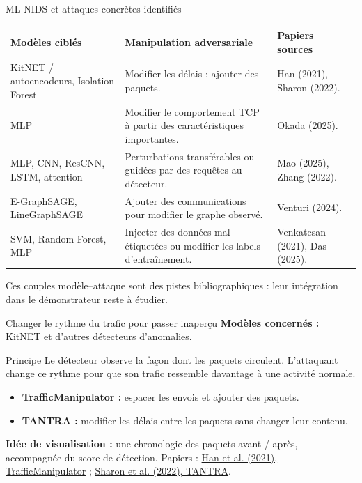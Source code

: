 \documentclass[aspectratio=169,11pt]{beamer}
\begin{document}
\begin{frame}{ML-NIDS et attaques concrètes identifiés}
  \small
  \renewcommand{\arraystretch}{1.35}
  \begin{tabularx}{\textwidth}{@{}p{}Xp{}@{}}
    \toprule
    \textbf{Modèles ciblés} & \textbf{Manipulation adversariale} & \textbf{Papiers sources} \\
    \midrule
    KitNET / autoencodeurs, Isolation Forest
      & Modifier les délais ; ajouter des paquets.
      & Han (2021), Sharon (2022). \\
    MLP
      & Modifier le comportement TCP à partir des caractéristiques importantes.
      & Okada (2025). \\
    MLP, CNN, ResCNN, LSTM, attention
      & Perturbations transférables ou guidées par des requêtes au détecteur.
      & Mao (2025), Zhang (2022). \\
    E-GraphSAGE, LineGraphSAGE
      & Ajouter des communications pour modifier le graphe observé.
      & Venturi (2024). \\
    SVM, Random Forest, MLP
      & Injecter des données mal étiquetées ou modifier les labels d'entraînement.
      & Venkatesan (2021), Das (2025). \\
    \bottomrule
  \end{tabularx}
  \vfill
  \small Ces couples modèle--attaque sont des pistes bibliographiques : leur intégration
  dans le démonstrateur reste à étudier.
\end{frame}

\begin{frame}{Changer le rythme du trafic pour passer inaperçu}
  \textbf{Modèles concernés :} KitNET et d'autres détecteurs d'anomalies.
  \vspace{1em}
  \begin{block}{Principe}
    Le détecteur observe la façon dont les paquets circulent.
    L'attaquant change ce rythme pour que son trafic ressemble davantage
    à une activité normale.
  \end{block}
  \begin{itemize}
    \setlength{\itemsep}{.8em}
    \item \textbf{TrafficManipulator :} espacer les envois et ajouter des paquets.
    \item \textbf{TANTRA :} modifier les délais entre les paquets sans changer leur contenu.
  \end{itemize}
  \vfill
  \textbf{Idée de visualisation :} une chronologie des paquets avant / après,
  accompagnée du score de détection.
  \vfill
  \footnotesize Papiers : \href{https://doi.org/10.1109/JSAC.2021.3087242}{Han et al. (2021), TrafficManipulator}
  ; \href{https://doi.org/10.1109/TIFS.2022.3201377}{Sharon et al. (2022), TANTRA}.
\end{frame}
\end{document}
